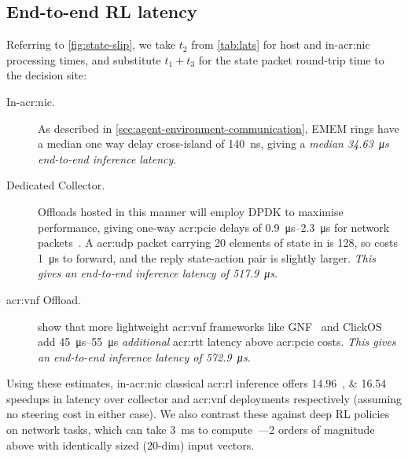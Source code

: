 \subsection{End-to-end RL latency}
Referring to \cref{fig:state-slip}, we take $t_2$ from \cref{tab:lats} for host and in-\gls{acr:nic} processing times, and substitute $t_1+t_3$ for the state packet round-trip time to the decision site:
\begin{description}
	\item[In-\gls{acr:nic}.] As described in \cref{sec:agent-environment-communication}, EMEM rings have a median one way delay cross-island of \qty{140}{\nano\second}, giving a \emph{median \qty{34.63}{\micro\second} end-to-end inference latency}.
	\item[Dedicated Collector.] Offloads hosted in this manner will employ DPDK to maximise performance, giving one-way \gls{acr:pcie} delays of \qtyrange{0.9}{2.3}{\micro\second} for network packets~\parencite{DBLP:conf/sigcomm/NeugebauerAZAL018}.
	A \gls{acr:udp} packet carrying \num{20} elements of state in \approachshort{} is \qty{128}{\byte}, so costs \qty{1}{\micro\second} to forward, and the reply state-action pair is slightly larger.
	\emph{This gives an end-to-end inference latency of \qty{517.9}{\micro\second}}.
	\item[\gls{acr:vnf} Offload.] \Textcite{DBLP:journals/cm/CzivaP17} show that more lightweight \gls{acr:vnf} frameworks like GNF~\parencite{DBLP:journals/cm/CzivaP17} and ClickOS~\parencite{DBLP:conf/nsdi/MartinsAROHBH14} add \qtyrange{45}{55}{\micro\second} \emph{additional} \gls{acr:rtt} latency above \gls{acr:pcie} costs.
	\emph{This gives an end-to-end inference latency of \qty{572.9}{\micro\second}}.
\end{description}
Using these estimates, in-\gls{acr:nic} classical \gls{acr:rl} inference offers \qtylist{14.96;16.54}{\times} speedups in latency over collector and \gls{acr:vnf} deployments respectively (assuming no steering cost in either case).
We also contrast these against deep RL policies on network tasks, which can take \qty{3}{\milli\second} to compute~\parencite{DBLP:journals/corr/abs-1910-04054}---2 orders of magnitude above \approachshort{} with identically sized (20-dim) input vectors.

